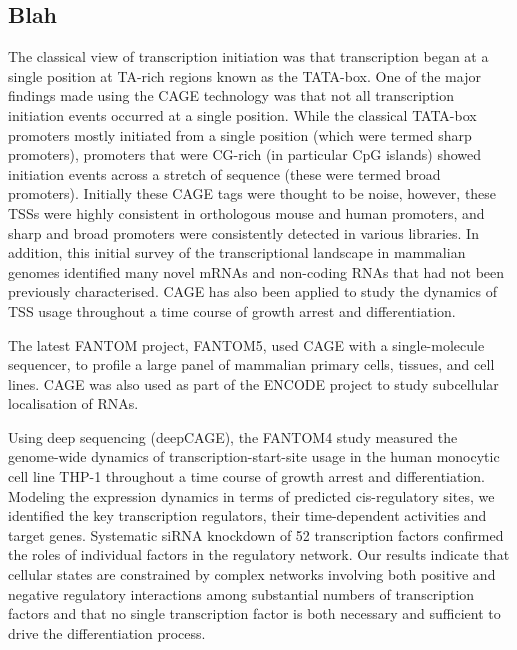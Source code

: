 \subsection{Blah}

The classical view of transcription initiation was that transcription began at a single position at TA-rich regions known as the TATA-box. One of the major findings made using the CAGE technology was that not all transcription initiation events occurred at a single position\cite{pmid16645617}. While the classical TATA-box promoters mostly initiated from a single position (which were termed sharp promoters), promoters that were CG-rich (in particular CpG islands) showed initiation events across a stretch of sequence (these were termed broad promoters). Initially these CAGE tags were thought to be noise, however, these TSSs were highly consistent in orthologous mouse and human promoters, and sharp and broad promoters were consistently detected in various libraries\cite{pmid16645617}. In addition, this initial survey of the transcriptional landscape in mammalian genomes identified many novel mRNAs and non-coding RNAs that had not been previously characterised\cite{pmid16141072}. CAGE has also been applied to study the dynamics of TSS usage throughout a time course of growth arrest and differentiation\cite{pmid19377474}.

The latest FANTOM project, FANTOM5, used CAGE with a single-molecule sequencer, to profile a large panel of mammalian primary cells, tissues, and cell lines\cite{pmid24670764}. CAGE was also used as part of the ENCODE project to study subcellular localisation of RNAs\cite{pmid22955620}.

Using deep sequencing (deepCAGE), the FANTOM4 study measured the genome-wide dynamics of transcription-start-site usage in the human monocytic cell line THP-1 throughout a time course of growth arrest and differentiation. Modeling the expression dynamics in terms of predicted cis-regulatory sites, we identified the key transcription regulators, their time-dependent activities and target genes. Systematic siRNA knockdown of 52 transcription factors confirmed the roles of individual factors in the regulatory network. Our results indicate that cellular states are constrained by complex networks involving both positive and negative regulatory interactions among substantial numbers of transcription factors and that no single transcription factor is both necessary and sufficient to drive the differentiation process.

